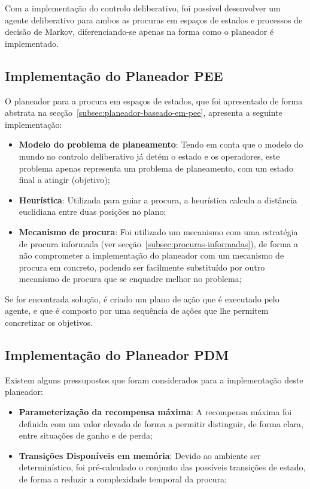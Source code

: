 Com a implementação do controlo deliberativo, foi possível desenvolver um agente deliberativo para ambos as procuras em espaços de estados e processos de decisão de Markov, diferenciando-se apenas na forma como o planeador é implementado.

\subsection{Implementação do Planeador PEE}\label{subsec:implementacao-planeador-pee}

O planeador para a procura em espaços de estados, que foi apresentado de forma abstrata na secção~\ref{subsec:planeador-baseado-em-pee},
apresenta a seguinte implementação:

\begin{itemize}
    \item \textbf{Modelo do problema de planeamento}: Tendo em conta que o modelo do mundo no controlo deliberativo já detém o estado e os operadores, este problema apenas representa um problema de planeamento, com um estado final a atingir (objetivo);
    \item \textbf{Heurística}: Utilizada para guiar a procura, a heurística calcula a distância euclidiana entre duas posições no plano;
    \item \textbf{Mecanismo de procura}: Foi utilizado um mecanismo com uma estratégia de procura informada (ver secção~\ref{subsec:procuras-informadas}), de forma a não comprometer a implementação do planeador com um mecanismo de procura em concreto, podendo ser facilmente substituído por outro mecanismo de procura que se enquadre melhor no problema;
\end{itemize}

Se for encontrada solução, é criado um plano de ação que é executado pelo agente, e que é composto por uma sequência de ações que lhe permitem concretizar os objetivos.

\subsection{Implementação do Planeador PDM}\label{subsec:implementacao-planeador-pdm}

Existem alguns pressupostos que foram considerados para a implementação deste planeador:

\begin{itemize}
    \item \textbf{Parameterização da recompensa máxima}: A recompensa máxima foi definida com um valor elevado de forma a permitir distinguir, de forma clara, entre situações de ganho e de perda;
    \item \textbf{Transições Disponíveis em memória}: Devido ao ambiente ser determinístico, foi pré-calculado o conjunto das possíveis transições de estado, de forma a reduzir a complexidade temporal da procura;
\end{itemize}

